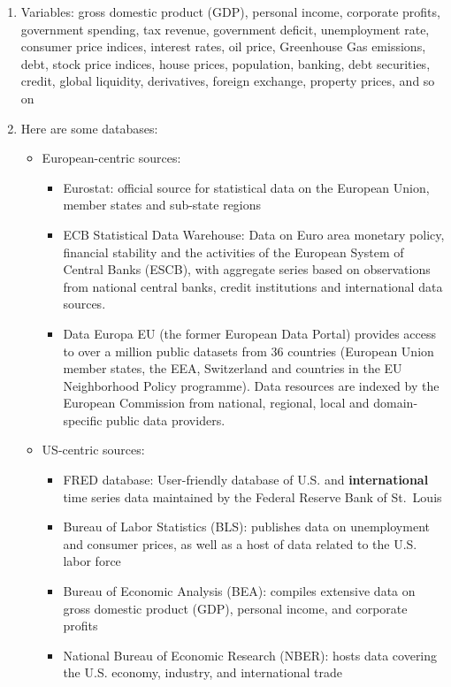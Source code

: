 \begin{enumerate}
\item Variables: gross domestic product (GDP), personal income, corporate profits, 
  government spending, tax revenue, government deficit, unemployment rate, consumer price indices,
  interest rates, oil price, Greenhouse Gas emissions, debt, stock price indices, house prices,
  population, banking, debt securities, credit, global liquidity, derivatives, foreign exchange, property prices,
  and so on
\item Here are some databases:
\begin{itemize}
    \item European-centric sources:
        \begin{itemize}
            \item Eurostat: official source for statistical data on the European Union, member states and sub-state regions
            \item ECB Statistical Data Warehouse:
            Data on Euro area monetary policy, financial stability and the activities of the European System of Central Banks (ESCB),
              with aggregate series based on observations from national central banks, credit institutions and international data sources.
            \item Data Europa EU (the former European Data Portal) provides access to over a million public datasets from 36 countries
            (European Union member states, the EEA, Switzerland and countries in the EU Neighborhood Policy programme).
            Data resources are indexed by the European Commission from national, regional, local and domain-specific public data providers. 
        \end{itemize}
    \item US-centric sources: 
        \begin{itemize}
            \item FRED database: User-friendly database of U.S. and \textbf{international} time series data maintained by the Federal Reserve Bank of St.\ Louis
            \item Bureau of Labor Statistics (BLS): publishes data on unemployment and consumer prices, as well as a host of data related to the U.S. labor force
            \item Bureau of Economic Analysis (BEA): compiles extensive data on gross domestic product (GDP), personal income, and corporate profits
            \item National Bureau of Economic Research (NBER): hosts data covering the U.S. economy, industry, and international trade

\end{itemize}
\end{itemize}
\end{enumerate}

